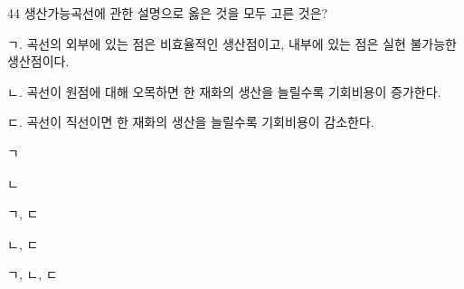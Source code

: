 \begin{question}{44}
생산가능곡선에 관한 설명으로 옳은 것을 모두 고른 것은?
\begin{framedtext}
ㄱ. 곡선의 외부에 있는 점은 비효율적인 생산점이고, 내부에 있는 점은 실현 불가능한 생산점이다. \par
ㄴ. 곡선이 원점에 대해 오목하면 한 재화의 생산을 늘릴수록 기회비용이 증가한다. \par
ㄷ. 곡선이 직선이면 한 재화의 생산을 늘릴수록 기회비용이 감소한다.
\end{framedtext}
\begin{choices}
  \item ㄱ
  \item ㄴ
  \item ㄱ, ㄷ
  \item ㄴ, ㄷ
  \item ㄱ, ㄴ, ㄷ
\end{choices}
\end{question}
